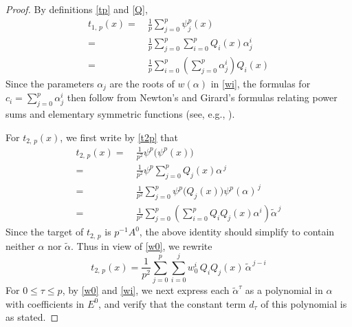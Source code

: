 \documentclass{gtpart}
\theoremstyle{definition}
\theoremstyle{remark}
\newcommand{\A}{\alpha}
\newcommand{\T}{\tau}
\renewcommand{\=}{\approx}
\renewcommand{\-}{\sim}
\numberwithin{equation}{section}
\numberwithin{thm}{section}
\begin{document}
\begin{proof}
 By definitions \eqref{tp} and \eqref{Q}, 
 \begin{equation*}
  \begin{split}
   t_{1,\,p}(x) = & ~ \frac{1}{p} \sum_{j=0}^p \psi^p_j(x) \\
                = & ~ \frac{1}{p} \sum_{j=0}^p \sum_{i=0}^p Q_i(x) \A_j^i \\
                = & ~ \frac{1}{p} \sum_{i=0}^p \left( \sum_{j=0}^p \A_j^i \right) Q_i(x) 
  \end{split}
 \end{equation*}
 Since the parameters $\A_j$ are the roots of $w(\A)$ in \eqref{wi}, the formulas for 
 $c_i = \sum_{j=0}^p \A_j^i$ then follow from Newton's and Girard's formulas relating power sums and elementary symmetric functions 
 (see, e.g., \cite[Problem 16-A]{cc}).  

 For $t_{2,\,p}(x)$, we first write by \eqref{t2p} that 
 \begin{equation*}
  \begin{split}
   t_{2,\,p}(x) = & ~ \frac{1}{p^2} \psi^p \big( \psi^p(x) \big) \\
                = & ~ \frac{1}{p^2} \psi^p \sum_{j=0}^p Q_j(x) \A^{\,j} \\
                = & ~ \frac{1}{p^2} \sum_{j=0}^p \psi^p \big( Q_j(x) \big) \psi^p(\A)^{\,j} \\
                = & ~ \frac{1}{p^2} \sum_{j=0}^p \left( \sum_{i=0}^p Q_i Q_j(x) \A^i \right) \widetilde{\A}^{\,j} 
  \end{split}
 \end{equation*}
 Since the target of $t_{2,\,p}$ is $p^{-1} A^0$, 
 the above identity should simplify to contain neither $\A$ nor $\widetilde{\A}$.  
 Thus in view of \eqref{w0}, we rewrite 
 \[
  t_{2,\,p}(x) = \frac{1}{p^2} \sum_{j=0}^p \sum_{i=0}^j w_0^i \, Q_i Q_j(x) \, \widetilde{\A}^{\,j - i} 
 \]
 For $0 \leq \T \leq p$, by \eqref{w0} and \eqref{wi}, 
 we next express each $\widetilde{\A}^\T$ as a polynomial in $\A$ 
 with coefficients in $E^0$, 
 and verify that the constant term $d_\T$ of this polynomial is as stated.  


\end{proof}
\end{document}
